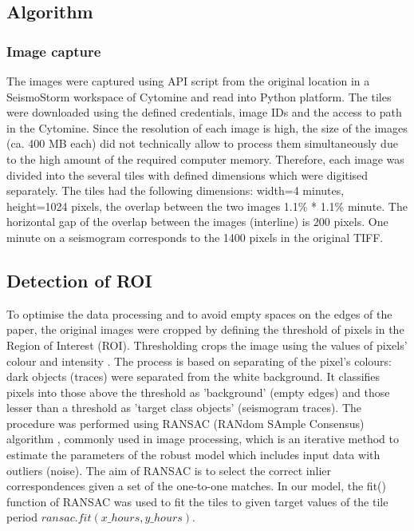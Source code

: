 \documentclass[a4paper,english,12pt]{article}
\begin{document}
\subsection{Algorithm}

\subsubsection{Image capture}

The images were captured using API script from the original location in a SeismoStorm workspace of Cytomine and read into Python platform. The tiles were downloaded using the defined credentials, image IDs and the access to path in the Cytomine. Since the resolution of each image is high, the size of the images (ca. 400 MB each) did not technically allow to process them simultaneously due to the high amount of the required computer memory. Therefore, each image was divided into the several tiles with defined dimensions which were digitised separately. The tiles had the following dimensions: width=4 minutes, height=1024 pixels, the overlap between the two images 1.1\% * 1.1\% minute. The horizontal gap of the overlap between the images (interline) is 200 pixels. One minute on a seismogram corresponds to the 1400 pixels in the original TIFF. 

\subsection{Detection of ROI}
To optimise the data processing and to avoid empty spaces on the edges of the paper, the original images were cropped by defining the threshold of pixels in the Region of Interest (ROI). Thresholding crops the image using the values of pixels' colour and intensity \cite{GonzalezWoods}. The process is based on separating of the pixel's colours: dark objects (traces) were separated from the white background. It classifies pixels into those above the threshold as 'background' (empty edges) and those lesser than a threshold as 'target class objects' (seismogram traces). The procedure was performed using RANSAC (RANdom SAmple Consensus) algorithm \cite{FischlerBolles}, commonly used in image processing, which is an iterative method to estimate the parameters of the robust model which includes input data with outliers (noise). The aim of RANSAC is to select the correct inlier correspondences given a set of the one-to-one matches. In our model, the fit() function of RANSAC was used to fit the tiles to given target values of the tile period $ransac.fit(x\_hours, y\_hours)$. 
\end{document}
